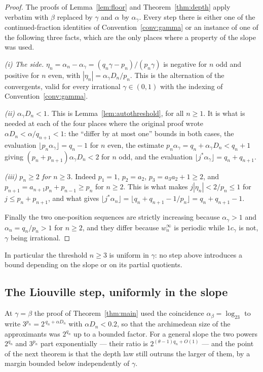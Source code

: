 \begin{proof}
The proofs of Lemma~\ref{lem:floor} and Theorem~\ref{thm:depth} apply verbatim
with $\beta$ replaced by $\gamma$ and $\alpha$ by $\alpha_\gamma$. Every step
there is either one of the continued-fraction identities of
Convention~\ref{conv:gamma} or an instance of one of the following three facts,
which are the only places where a property of the slope was used.

\emph{(i) The side.} $\eta_n=\alpha_n-\alpha_\gamma=(q_n\gamma-p_n)/(p_n\gamma)$
is negative for $n$ odd and positive for $n$ even, with
$|\eta_n|=\alpha_\gamma D_n/p_n$. This is the alternation of the convergents,
valid for every irrational $\gamma\in(0,1)$ with the indexing of
Convention~\ref{conv:gamma}.

\emph{(ii) $\alpha_\gamma D_n<1$.} This is Lemma~\ref{lem:autothreshold}, for
all $n\ge1$. It is what is needed at each of the four places where the original
proof wrote $\alpha D_n<\alpha/q_{n+1}<1$: the ``differ by at most one'' bounds
in both cases, the evaluation $\lfloor p_n\alpha_\gamma\rfloor=q_n-1$ for $n$
even, the estimate $p_n\alpha_\gamma=q_n+\alpha_\gamma D_n<q_n+1$ giving
$(p_n+p_{n+1})\alpha_\gamma D_n<2$ for $n$ odd, and the evaluation
$\lfloor j^{*}\alpha_\gamma\rfloor=q_n+q_{n+1}$.

\emph{(iii) $p_n\ge2$ for $n\ge3$.} Indeed $p_1=1$, $p_2=a_2$,
$p_3=a_3a_2+1\ge2$, and $p_{n+1}=a_{n+1}p_n+p_{n-1}\ge p_n$ for $n\ge2$. This
is what makes $j|\eta_n|<2/p_n\le1$ for $j\le p_n+p_{n+1}$, and what gives
$\lfloor j^{*}\alpha_n\rfloor=\lfloor q_n+q_{n+1}-1/p_n\rfloor=q_n+q_{n+1}-1$.

Finally the two one-position sequences are strictly increasing because
$\alpha_\gamma>1$ and $\alpha_n=q_n/p_n>1$ for $n\ge2$, and they differ because
$w_n^\infty$ is periodic while $1c_\gamma$ is not, $\gamma$ being irrational.
\end{proof}

\noindent In particular the threshold $n\ge3$ is uniform in $\gamma$: no step
above introduces a bound depending on the slope or on its partial quotients.

\subsection*{The Liouville step, uniformly in the slope}

At $\gamma=\beta$ the proof of Theorem~\ref{thm:main} used the coincidence
$\alpha_\beta=\log_23$ to write $3^{p_n}=2^{\,q_n+\alpha D_n}$ with
$\alpha D_n<0.2$, so that the archimedean size of the approximants was
$2^{q_n}$ up to a bounded factor. For a general slope the two powers $2^{q_n}$
and $3^{p_n}$ part exponentially --- their ratio is
$2^{(\theta-1)q_n+O(1)}$ --- and the point of the next theorem is that the
depth law still outruns the larger of them, by a margin bounded below
independently of $\gamma$.

